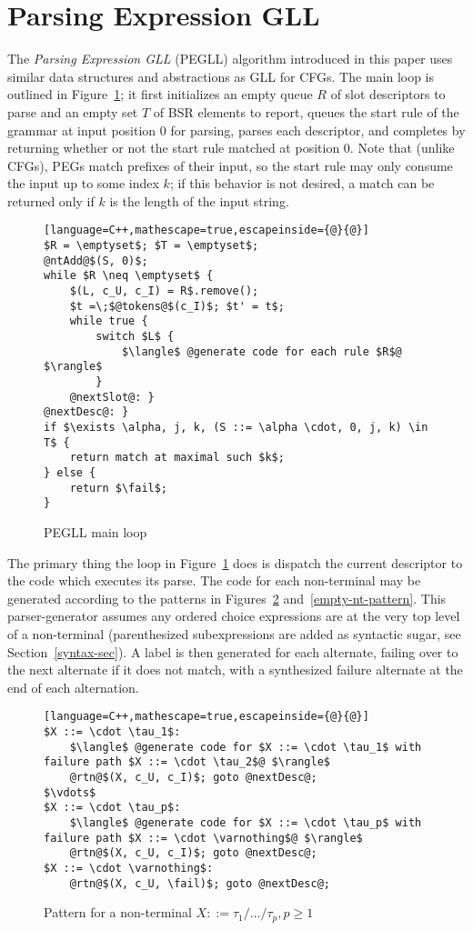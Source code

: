 \documentclass{article}
\newcommand{\fail}{\mathsf{fail}}
\begin{document}
\section{Parsing Expression GLL}
The \emph{Parsing Expression GLL} (PEGLL) algorithm introduced in this paper uses similar data structures and abstractions as GLL for CFGs. 
The main loop is outlined in Figure~\ref{main-loop-algo}; it first initializes an empty queue $R$ of slot descriptors to parse and an empty set $T$ of BSR elements to report, queues the start rule of the grammar at input position 0 for parsing, parses each descriptor, and completes by returning whether or not the start rule matched at position 0. 
Note that (unlike CFGs), PEGs match prefixes of their input, so the start rule may only consume the input up to some index $k$; if this behavior is not desired, a match can be returned only if $k$ is the length of the input string.

\begin{figure}
\caption{PEGLL main loop} \label{main-loop-algo}
\begin{lstlisting}[language=C++,mathescape=true,escapeinside={@}{@}]
$R = \emptyset$; $T = \emptyset$;
@ntAdd@$(S, 0)$;
while $R \neq \emptyset$ {
    $(L, c_U, c_I) = R$.remove();
    $t =\;$@tokens@$(c_I)$; $t' = t$;
    while true {
        switch $L$ {
            $\langle$ @generate code for each rule $R$@ $\rangle$
        }
    @nextSlot@: }
@nextDesc@: }
if $\exists \alpha, j, k, (S ::= \alpha \cdot, 0, j, k) \in T$ {
    return match at maximal such $k$;
} else {
    return $\fail$;
}
\end{lstlisting}
\end{figure}

The primary thing the loop in Figure~\ref{main-loop-algo} does is dispatch the current descriptor to the code which executes its parse. 
The code for each non-terminal may be generated according to the patterns in Figures~\ref{nt-pattern} and~\ref{empty-nt-pattern}. 
This parser-generator assumes any ordered choice expressions are at the very top level of a non-terminal (parenthesized subexpressions are added as syntactic sugar, see Section~\ref{syntax-sec}). 
A label is then generated for each alternate, failing over to the next alternate if it does not match, with a synthesized failure alternate at the end of each alternation.

\begin{figure}
\caption[Non-terminal code pattern]{Pattern for a non-terminal $X ::= \tau_1 / \ldots / \tau_p, p \geq 1$} \label{nt-pattern}
\begin{lstlisting}[language=C++,mathescape=true,escapeinside={@}{@}]
$X ::= \cdot \tau_1$:
	$\langle$ @generate code for $X ::= \cdot \tau_1$ with failure path $X ::= \cdot \tau_2$@ $\rangle$
	@rtn@$(X, c_U, c_I)$; goto @nextDesc@;
$\vdots$
$X ::= \cdot \tau_p$:
	$\langle$ @generate code for $X ::= \cdot \tau_p$ with failure path $X ::= \cdot \varnothing$@ $\rangle$
	@rtn@$(X, c_U, c_I)$; goto @nextDesc@;
$X ::= \cdot \varnothing$:
	@rtn@$(X, c_U, \fail)$; goto @nextDesc@;
\end{lstlisting}
\end{figure}
\end{document}
